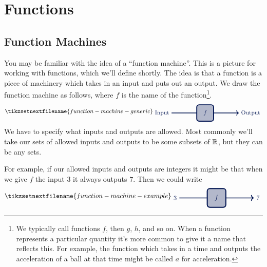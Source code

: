 \documentclass[fleqn]{LectureClass/LectureClass}
\begin{document}
    \chapter{Functions}
    \section{Function Machines}
    You may be familiar with the idea of a \enquote{function machine}.
    This is a picture for working with functions, which we'll define shortly.
    The idea is that a function is a piece of machinery which takes in an input and puts out an output.
    We draw the function machine as follows, where \(f\) is the name of the function\footnote{We typically call functions \(f\), then \(g\), \(h\), and so on. When a function represents a particular quantity it's more common to give it a name that reflects this. For example, the function which takes in a time and outputs the acceleration of a ball at that time might be called \(a\) for acceleration.}.
    \begin{equation}
        \tikzsetnextfilename{function-machine-generic}
        \begin{tikzpicture}[baseline=(current bounding box)]
            \draw [very thick, glasgowBlue] (-1.5, 0) node [left] {Input} -- ++ (1.5, 0);
            \draw [ultra thick, glasgowBlue, fill=glasgowBlue!30, rounded corners] (0, -0.5) rectangle (1, 0.5) node [midway] {\(f\)};
            \draw [very thick, glasgowBlue, ->] (1, 0) -- ++ (1.5, 0) node [right] {Output}; 
        \end{tikzpicture}
    \end{equation}
    We have to specify what inputs and outputs are allowed.
    Most commonly we'll take our sets of allowed inputs and outputs to be some subsets of \(\mathbb{R}\), but they can be any sets.
    
    For example, if our allowed inputs and outputs are integers it might be that when we give \(f\) the input \(3\) it always outputs \(7\).
    Then we could write
    \begin{equation}
        \tikzsetnextfilename{function-machine-example}
        \begin{tikzpicture}[baseline=(current bounding box)]
            \draw [very thick, glasgowBlue] (-1.5, 0) node [left] {\(3\)} -- ++ (1.5, 0);
            \draw [ultra thick, glasgowBlue, fill=glasgowBlue!30, rounded corners] (0, -0.5) rectangle (1, 0.5) node [midway] {\(f\)};
            \draw [very thick, glasgowBlue, ->] (1, 0) -- ++ (1.5, 0) node [right] {\(7\)}; 
        \end{tikzpicture}
    \end{equation}
    
\end{document}
